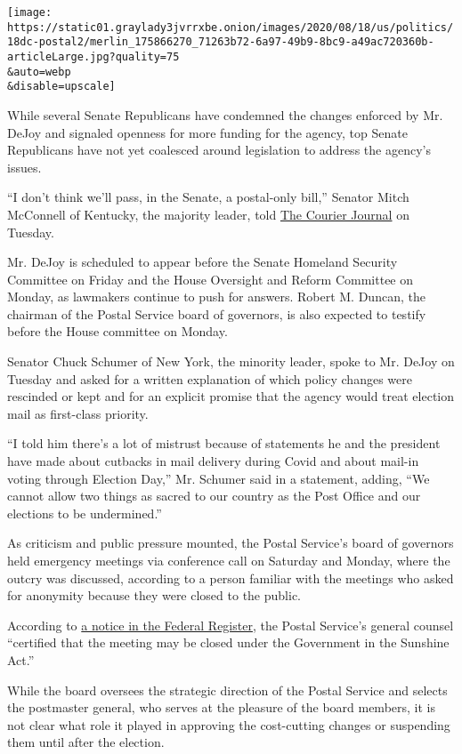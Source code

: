 \texttt{[image: https://static01.graylady3jvrrxbe.onion/images/2020/08/18/us/politics/18dc-postal2/merlin\_175866270\_71263b72-6a97-49b9-8bc9-a49ac720360b-articleLarge.jpg?quality=75\\\&auto=webp\\\&disable=upscale]}

While several Senate Republicans have condemned the changes enforced by
Mr. DeJoy and signaled openness for more funding for the agency, top
Senate Republicans have not yet coalesced around legislation to address
the agency's issues.

``I don't think we'll pass, in the Senate, a postal-only bill,'' Senator
Mitch McConnell of Kentucky, the majority leader, told
\href{https://www.courier-journal.com/story/news/politics/2020/08/18/mcconnell-houses-postal-service-bill-may-negotiating-opportunity/3392267001/}{The
Courier Journal} on Tuesday.

Mr. DeJoy is scheduled to appear before the Senate Homeland Security
Committee on Friday and the House Oversight and Reform Committee on
Monday, as lawmakers continue to push for answers. Robert M. Duncan, the
chairman of the Postal Service board of governors, is also expected to
testify before the House committee on Monday.

Senator Chuck Schumer of New York, the minority leader, spoke to Mr.
DeJoy on Tuesday and asked for a written explanation of which policy
changes were rescinded or kept and for an explicit promise that the
agency would treat election mail as first-class priority.

``I told him there's a lot of mistrust because of statements he and the
president have made about cutbacks in mail delivery during Covid and
about mail-in voting through Election Day,'' Mr. Schumer said in a
statement, adding, ``We cannot allow two things as sacred to our country
as the Post Office and our elections to be undermined.''

As criticism and public pressure mounted, the Postal Service's board of
governors held emergency meetings via conference call on Saturday and
Monday, where the outcry was discussed, according to a person familiar
with the meetings who asked for anonymity because they were closed to
the public.

According to
\href{https://s3.amazonaws.com/public-inspection.federalregister.gov/2020-18366.pdf}{a
notice in the Federal Register}, the Postal Service's general counsel
``certified that the meeting may be closed under the Government in the
Sunshine Act.''

While the board oversees the strategic direction of the Postal Service
and selects the postmaster general, who serves at the pleasure of the
board members, it is not clear what role it played in approving the
cost-cutting changes or suspending them until after the election.

